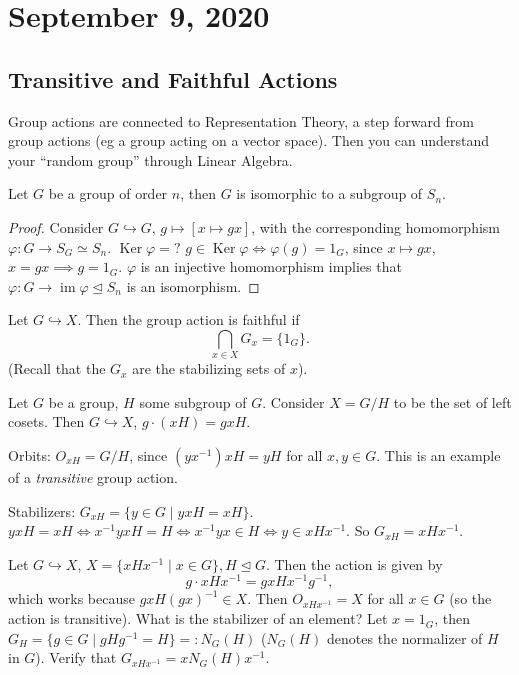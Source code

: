 \section{September 9, 2020}
\subsection{Transitive and Faithful Actions}
Group actions are connected to Representation Theory, a step forward from group actions (eg a group acting on a vector space). Then you can understand your ``random group'' through Linear Algebra.
\begin{prop}
    Let $G$ be a group of order $n$, then $G$ is isomorphic to a subgroup of $S_n$.
\end{prop}
\begin{proof}
    Consider $G \hookrightarrow G$, $g \mapsto [x \mapsto gx]$, with the corresponding homomorphism $\varphi \colon G \to S_G \simeq S_n$. $\operatorname{Ker}\varphi=?$ $g\in \operatorname{Ker}\varphi \iff \varphi(g)=1_G$, since $x\mapsto gx$, $x=gx \implies g=1_G$. $\varphi$ is an injective homomorphism implies that $\varphi \colon G \to \operatorname{im}\varphi \trianglelefteq S_n$ is an isomorphism.
\end{proof}

\begin{definition}
    Let $G \hookrightarrow X$. Then the group action is faithful if \[
    \bigcap_{x\in X} G_x = \{1_G\} .
\] (Recall that the $G_x$ are the stabilizing sets of $x$).
\end{definition}
\begin{example}
    Let $G$ be a group, $H$ some subgroup of $G$. Consider $X=G/H$ to be the set of left cosets. Then $G \hookrightarrow X$, $g\cdot (xH)=gxH$.

    Orbits: $O_{xH}=G/H$, since $(yx^{-1})xH=yH$ for all $x,y \in G$. This is an example of a \emph{transitive} group action.

    Stabilizers: $G_{xH}=\{y\in G \mid yxH=xH\}$. $yxH=xH \iff x^{-1}yxH=H \iff x^{-1}yx \in H \iff y\in xHx^{-1}$. So $G_{xH}=xHx^{-1}$.
\end{example}
\begin{example}
    Let $G \hookrightarrow X$, $X=\{xHx^{-1} \mid x\in G\}, H \trianglelefteq G$. Then the action is given by \[
    g\cdot xHx^{-1}=gxHx^{-1}g^{-1},
\] which works because $gxH(gx)^{-1}\in X$. Then $O_{xHx^{-1}}=X$ for all $x\in G$ (so the action is transitive). What is the stabilizer of an element? Let $x=1_G$, then $G_H=\{g\in G \mid gHg^{-1}=H\} =: N_G(H) $ ($N_G(H)$ denotes the normalizer of $H$ in $G$). Verify that $G_{xHx^{-1}}=xN_G(H)x^{-1}$.
\end{example}
